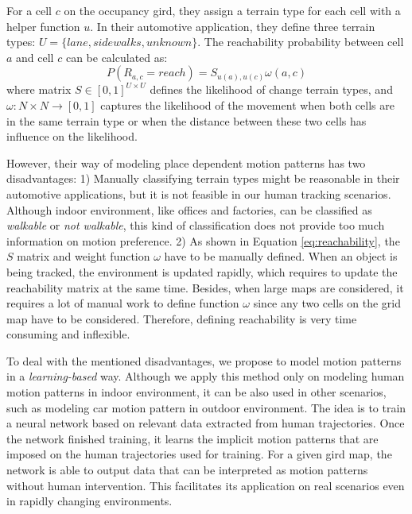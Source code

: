 For a cell $c$ on the occupancy gird, they assign a terrain type for each cell with a helper function $u$. In their automotive application, they define three terrain types: $U=\{lane, sidewalks, unknown\}$. The reachability probability between cell $a$ and cell $c$ can be calculated as:
\begin{equation}
P(R_{a,c}=reach) = S_{u(a), u(c)} \omega(a, c) \label{eq:reachability}
\end{equation}
where matrix $S\in[0,1]^{U\times U}$ defines the likelihood of change terrain types, and $\omega: N \times N \rightarrow [0,1]$ captures the likelihood of the movement when both cells are in the same terrain type or when the distance between these two cells has influence on the likelihood.

However, their way of modeling place dependent motion patterns has two disadvantages: 1) Manually classifying terrain types might be reasonable in their automotive applications, but it is not feasible in our human tracking scenarios. Although indoor environment, like offices and factories, can be classified as \textit{walkable} or \textit{not walkable}, this kind of classification does not provide too much information on motion preference. 2) As shown in Equation \ref{eq:reachability}, the $S$ matrix and weight function $\omega$ have to be manually defined. When an object is being tracked, the environment is updated rapidly, which requires to update the reachability matrix at the same time. Besides, when large maps are considered, it requires a lot of manual work to define function $\omega$ since any two cells on the grid map have to be considered. Therefore, defining reachability is very time consuming and inflexible. 

To deal with the mentioned disadvantages, we propose to model motion patterns in a \textit{learning-based} way. Although we apply this method only on modeling human motion patterns in indoor environment, it can be also used in other scenarios, such as modeling car motion pattern in outdoor environment. The idea is to train a neural network based on relevant data extracted from human trajectories. Once the network finished training, it learns the implicit motion patterns that are imposed on the human trajectories used for training. For a given gird map, the network is able to output data that can be interpreted as motion patterns without human intervention. This facilitates its application on real scenarios even in rapidly changing environments.   

